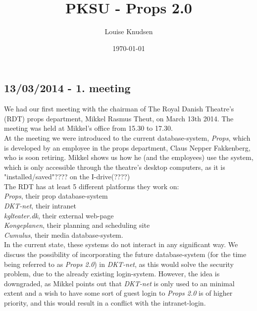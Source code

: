 \documentclass[12pt]{article}
\title{PKSU - Props 2.0}
\author{Louise Knudsen}
\date{\today}
\begin{document}
\maketitle
\subsection*{13/03/2014 - 1. meeting}
We had our first meeting with the chairman of The Royal Danish Theatre's (RDT) props department, Mikkel Rasmus Theut, on March 13th 2014. The meeting was held at Mikkel's office from 15.30 to 17.30. \\
At the meeting we were introduced to the current database-system, \textit{Props}, which is developed by an employee in the props department, Claus Nepper Fakkenberg, who is soon retiring. Mikkel shows us how he (and the employees) use the system, which is only accessible through the theatre's desktop computers, as it is "installed/saved"???? on the I-drive(????) \\
The RDT has at least 5 different platforms they work on: \\
\textit{Props}, their prop database-system \\
\textit{DKT-net}, their intranet \\
\textit{kglteater.dk}, their external web-page  \\
\textit{Kongeplanen}, their planning and scheduling site \\
\textit{Cumulus}, their media database-system. \\
In the current state, these systems do not interact in any significant way. We discuss the possibility of incorporating the future database-system (for the time being referred to as \textit{Props 2.0}) in \textit{DKT-net}, as this would solve the security problem, due to the already existing login-system. However, the idea is downgraded, as Mikkel points out that \textit{DKT-net} is only used to an minimal extent and a wish to have some sort of guest login to \textit{Props 2.0} is of higher priority, and this would result in a conflict with the intranet-login. \\
\end{document}
